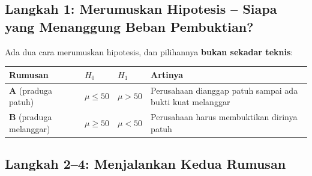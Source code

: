 \documentclass[
  indonesian,
  letterpaper,
]{book}
\newcounter{none} %
\begin{document}
\subsection{Langkah 1: Merumuskan Hipotesis -- Siapa yang Menanggung
Beban
Pembuktian?}\label{langkah-1-merumuskan-hipotesis-siapa-yang-menanggung-beban-pembuktian}

Ada dua cara merumuskan hipotesis, dan pilihannya \textbf{bukan sekadar
teknis}:

{\def\LTcaptype{none} %
\begin{longtable}[]{@{}
  >{\raggedright\arraybackslash}p{}
  >{\raggedright\arraybackslash}p{}
  >{\raggedright\arraybackslash}p{}
  >{\raggedright\arraybackslash}p{}@{}}
\toprule\noalign{}
\begin{minipage}[b]{\linewidth}\raggedright
Rumusan
\end{minipage} & \begin{minipage}[b]{\linewidth}\raggedright
\(H_0\)
\end{minipage} & \begin{minipage}[b]{\linewidth}\raggedright
\(H_1\)
\end{minipage} & \begin{minipage}[b]{\linewidth}\raggedright
Artinya
\end{minipage} \\
\midrule\noalign{}
\endhead
\bottomrule\noalign{}
\endlastfoot
\textbf{A} (praduga patuh) & \(\mu \le 50\) & \(\mu > 50\) & Perusahaan
dianggap patuh sampai ada bukti kuat melanggar \\
\textbf{B} (praduga melanggar) & \(\mu \ge 50\) & \(\mu < 50\) &
Perusahaan harus membuktikan dirinya patuh \\
\end{longtable}
}

\subsection{Langkah 2--4: Menjalankan Kedua
Rumusan}\label{langkah-24-menjalankan-kedua-rumusan}
\end{document}
